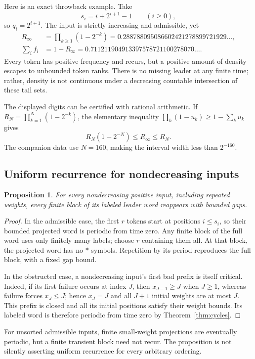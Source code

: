 \documentclass[11pt,letterpaper]{article}
\newtheorem{proposition}[theorem]{Proposition}
\theoremstyle{definition}
\begin{document}
Here is an exact throwback example. Take
\begin{equation}\label{eq:escapeexample}
 s_i=i+2^{i+1}-1\qquad(i\ge0),
\end{equation}
so $q_i=2^{i+1}$. The input is strictly increasing and admissible, yet
\begin{align*}
 R_\infty&=\prod_{k\ge1}(1-2^{-k})
       =0.288788095086602421278899721929\ldots,\\
 \sum_i f_i&=1-R_\infty
       =0.711211904913397578721100278070\ldots.
\end{align*}
Every token has positive frequency and recurs, but a positive amount of
density escapes to unbounded token ranks. There is no missing leader at any
finite time; rather, density is not continuous under a decreasing countable
intersection of these tail sets.

The displayed digits can be certified with rational arithmetic. If
$R_N=\prod_{k=1}^N(1-2^{-k})$, the elementary inequality
$\prod_k(1-u_k)\ge1-\sum_ku_k$ gives
\begin{equation}\label{eq:productbound}
 R_N(1-2^{-N})\le R_\infty\le R_N.
\end{equation}
The companion data use $N=160$, making the interval width less than $2^{-160}$.

\subsection{Uniform recurrence for nondecreasing inputs}
\begin{proposition}\label{prop:uniform}
For every nondecreasing positive input, including repeated weights, every
finite block of its labeled leader word reappears with bounded gaps.
\end{proposition}
\begin{proof}
In the admissible case, the first $r$ tokens start at positions $i\le s_i$,
so their bounded projected word is periodic from time zero. Any finite block
of the full word uses only finitely many labels; choose $r$ containing them
all. At that block, the projected word has no $\ast$ symbols. Repetition by
its period reproduces the full block, with a fixed gap bound.

In the obstructed case, a nondecreasing input's first bad prefix is itself
critical. Indeed, if its first failure occurs at index $J$, then
$x_{J-1}\ge J$ when $J\ge1$, whereas failure forces $x_J\le J$; hence
$x_J=J$ and all $J+1$ initial weights are at most $J$. This prefix is closed
and all its initial positions satisfy their weight bounds. Its labeled word
is therefore periodic from time zero by Theorem~\ref{thm:cycles}.
\end{proof}
For unsorted admissible inputs, finite small-weight projections are eventually
periodic, but a finite transient block need not recur. The proposition is
not silently asserting uniform recurrence for every arbitrary ordering.
\end{document}
